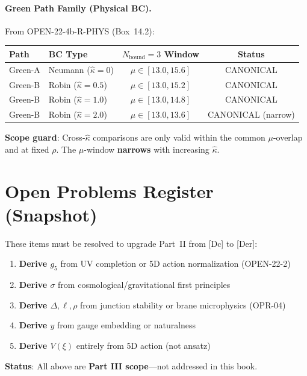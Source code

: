 \paragraph{Green Path Family (Physical BC).}
From OPEN-22-4b-R-PHYS (Box~14.2):

\begin{center}
\renewcommand{\arraystretch}{1.3}
\begin{tabular}{llcc}
\toprule
\textbf{Path} & \textbf{BC Type} & \textbf{$N_{\text{bound}}=3$ Window} & \textbf{Status} \\
\midrule
\rowcolor{green!15}
Green-A & Neumann ($\hat\kappa = 0$) & $\mu \in [13.0, 15.6]$ & CANONICAL \\
\rowcolor{green!10}
Green-B & Robin ($\hat\kappa = 0.5$) & $\mu \in [13.0, 15.2]$ & CANONICAL \\
\rowcolor{green!10}
Green-B & Robin ($\hat\kappa = 1.0$) & $\mu \in [13.0, 14.8]$ & CANONICAL \\
\rowcolor{green!10}
Green-B & Robin ($\hat\kappa = 2.0$) & $\mu \in [13.0, 13.6]$ & CANONICAL (narrow) \\
\bottomrule
\end{tabular}
\end{center}

\textbf{Scope guard}: Cross-$\hat\kappa$ comparisons are only valid within the common $\mu$-overlap
and at fixed $\rho$. The $\mu$-window \textbf{narrows} with increasing $\hat\kappa$.


\section{Open Problems Register (Snapshot)}
\label{sec:ch20_open_problems}

\begin{tcolorbox}[colback=red!5!white, colframe=red!50!black,
    title=\textbf{Blocking for ``No [P]'' Book (Part III Campaign)}]

These items must be resolved to upgrade Part~II from [Dc] to [Der]:

\begin{enumerate}[nosep]
    \item \textbf{Derive $g_5$} from UV completion or 5D action normalization (OPEN-22-2)
    \item \textbf{Derive $\sigma$} from cosmological/gravitational first principles
    \item \textbf{Derive $\Delta, \ell, \rho$} from junction stability or brane microphysics (OPR-04)
    \item \textbf{Derive $y$} from gauge embedding or naturalness
    \item \textbf{Derive $V(\xi)$} entirely from 5D action (not ansatz)
\end{enumerate}

\textbf{Status}: All above are \textbf{Part III scope}---not addressed in this book.
\end{tcolorbox}

